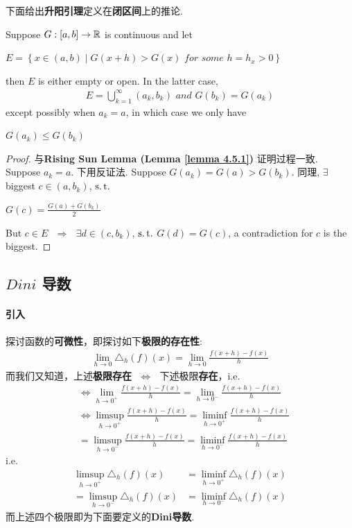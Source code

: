 	\newpage
	下面给出\textbf{升阳引理}定义在\textbf{闭区间}上的推论.
	\begin{corollary}\label{cor 4.5.2}
		Suppose $G : [a , b] \rightarrow \mathbb{R}$ is continuous and let
		\begin{center}
			$E = \left\{ x \in (a , b) \mid G(x + h) > G(x) \,\, for \,\, some \,\, h = h_x > 0 \right\}$
		\end{center}
		then $E$ is either empty or open. In the latter case, 
		\begin{align}
			E = \bigcup_{k = 1}^{\infty}{(a_k , b_k)} \,\, and \,\, G(b_k) = G(a_k)
		\end{align}
		except possibly when $a_k = a$, in which case we only have
		\begin{center}
			$G(a_k) \leq G(b_k)$
		\end{center}
	
		\vspace{8em}
		\begin{proof}
			与\textbf{Rising Sun Lemma (Lemma \ref{lemma 4.5.1})} 证明过程一致. \\
			Suppose $a_k = a$. 下用反证法. Suppose $G(a_k) = G(a) > G(b_k)$. 同理, $\exists$ biggest $c \in (a , b_k)$, $\operatorname{s.t.}$
			\begin{center}
				$G(c) = \frac{G(a) + G(b_k)}{2}$
			\end{center}
			But $c \in E$ $\,\, \Rightarrow \,\,$ $\exists d \in (c , b_k)$, $\operatorname{s.t.}$ $G(d) = G(c)$, a contradiction for $c$ is the biggest.
		\end{proof}
	\end{corollary}

\newpage
\subsection{$Dini$ 导数}
\paragraph{引入}
	探讨函数的\textbf{可微性}，即探讨如下\textbf{极限的存在性}:
	\begin{align}
		\lim_{h \to 0}{\triangle_{h}(f)(x)} = \lim_{h \to 0}{\frac{f(x + h) - f(x)}{h}}
	\end{align}
	而我们又知道，上述\textbf{极限存在} $\,\, \Leftrightarrow \,\,$ 下述极限\textbf{存在}，i.e.
	\begin{align}
		&\Leftrightarrow \lim_{h \to 0^{+}}{\frac{f(x + h) - f(x)}{h}} = \lim_{h \to 0^{-}}{\frac{f(x + h) - f(x)}{h}} \\
		&\Leftrightarrow \limsup_{h \to 0^{+}}{\frac{f(x + h) - f(x)}{h}} = \liminf_{h \to 0^{+}}{\frac{f(x + h) - f(x)}{h}} \\
		&= \limsup_{h \to 0^{-}}{\frac{f(x + h) - f(x)}{h}} = \liminf_{h \to 0^{-}}{\frac{f(x + h) - f(x)}{h}}
	\end{align}
	i.e.
	\begin{align}
		\limsup_{h \to 0^{+}}{\triangle_{h}(f)(x)}
		&= \liminf_{h \to 0^{+}}{\triangle_{h}(f)(x)} \\
		= \limsup_{h \to 0^{-}}{\triangle_{h}(f)(x)}
		&= \liminf_{h \to 0^{-}}{\triangle_{h}(f)(x)}
	\end{align}
	而上述四个极限即为下面要定义的\textbf{Dini导数}.

